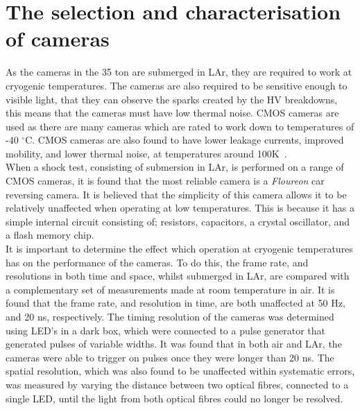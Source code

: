\section{The selection and characterisation of cameras} \label{sec:CamSelec} %
As the cameras in the 35 ton are submerged in LAr, they are required to work at cryogenic temperatures. The cameras are also required to be sensitive enough to visible light, that they can observe the sparks created by the HV breakdowns, this means that the cameras must have low thermal noise. CMOS cameras are used as there are many cameras which are rated to work down to temperatures of -40 $^{\circ}$C. CMOS cameras are also found to have lower leakage currents, improved mobility, and lower thermal noise, at temperatures around 100K~\citep{thermalnoise1,thermalnoise2}. \\

When a shock test, consisting of submersion in LAr, is performed on a range of CMOS cameras, it is found that the most reliable camera is a \emph{Floureon} car reversing camera. It is believed that the simplicity of this camera allows it to be relatively unaffected when operating at low temperatures. This is because it has a simple internal circuit consisting of; resistors, capacitors, a crystal oscillator, and a flash memory chip. \\

It is important to determine the effect which operation at cryogenic temperatures has on the performance of the cameras. To do this, the frame rate, and resolutions in both time and space, whilst submerged in LAr, are compared with a complementary set of measurements made at room temperature in air. It is found that the frame rate, and resolution in time, are both unaffected at 50 Hz, and 20 ns, respectively. The timing resolution of the cameras was determined using LED's in a dark box, which were connected to a pulse generator that generated pulses of variable widths. It was found that in both air and LAr, the cameras were able to trigger on pulses once they were longer than 20 ns. The spatial resolution, which was also found to be unaffected within systematic errors, was measured by varying the distance between two optical fibres, connected to a single LED, until the light from both optical fibres could no longer be resolved. \\

